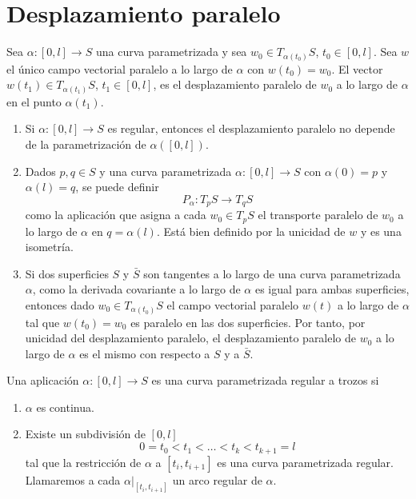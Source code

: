 \section{Desplazamiento paralelo}

\begin{definition}
    Sea $\alpha : [0, l] \to S$ una curva parametrizada y sea $w_0 \in T_{\alpha(t_0)}S$, $t_0 \in [0, l]$.
    Sea $w$ el único campo vectorial paralelo a lo largo de $\alpha$ con $w(t_0) = w_0$.
    El vector $w(t_1) \in T_{\alpha(t_1)}S$, $t_1 \in [0, l]$, es el desplazamiento paralelo de $w_0$ a lo largo de $\alpha$ en el punto $\alpha(t_1)$.
\end{definition}

\begin{properties}
    \hfill
    \begin{enumerate}
        \item Si $\alpha : [0, l] \to S$ es regular, entonces el desplazamiento paralelo no depende de la parametrización de $\alpha([0, l])$.
        \item Dados $p, q \in S$ y una curva parametrizada $\alpha: [0, l] \to S$ con $\alpha(0) = p$ y $\alpha(l) = q$, se puede definir
              $$P_\alpha : T_pS \to T_qS$$
              como la aplicación que asigna a cada $w_0 \in T_pS$ el transporte paralelo de $w_0$ a lo largo de $\alpha$ en $q = \alpha(l)$.
              Está bien definido por la unicidad de $w$ y es una isometría.
        \item Si dos superficies $S$ y $\bar{S}$ son tangentes a lo largo de una curva parametrizada $\alpha$, como la derivada covariante a lo largo de $\alpha$ es igual para ambas superficies, entonces dado $w_0 \in T_{\alpha(t_0)}S$ el campo vectorial paralelo $w(t)$ a lo largo de $\alpha$ tal que $w(t_0) = w_0$ es paralelo en las dos superficies.
              Por tanto, por unicidad del desplazamiento paralelo, el desplazamiento paralelo de $w_0$ a lo largo de $\alpha$ es el mismo con respecto a $S$ y a $\bar{S}$.
    \end{enumerate}
\end{properties}

\begin{definition}
    Una aplicación $\alpha : [0, l] \to S$ es una curva parametrizada regular a trozos si
    \begin{enumerate}
        \item $\alpha$ es continua.
        \item Existe un subdivisión de $[0, l]$
              $$0 = t_0 < t_1 < \dots < t_k < t_{k+1} = l$$
              tal que la restricción de $\alpha$ a $[t_i, t_{i+1}]$ es una curva parametrizada regular.
              Llamaremos a cada $\alpha |_{[t_i, t_{i+1}]}$ un arco regular de $\alpha$.
    \end{enumerate}
\end{definition}

